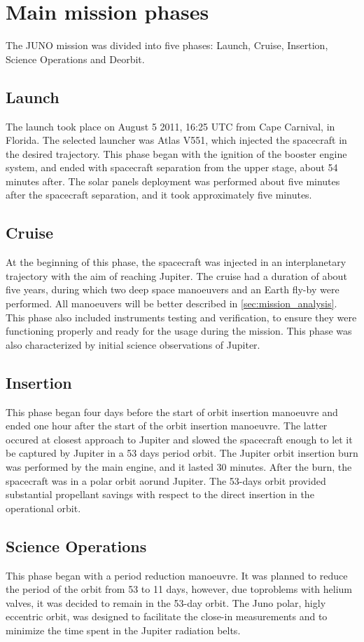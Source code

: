 \section{Main mission phases}
\label{sec:phases}
The JUNO mission was divided into five phases: Launch, Cruise, Insertion, Science Operations and Deorbit.
\subsection{Launch}
The launch took place on August 5 2011, 16:25 UTC from Cape Carnival, in Florida. The selected launcher was Atlas V551, which injected the spacecraft in the 
desired trajectory. This phase began with the ignition of the booster engine system, and ended with spacecraft separation from the upper
 stage,  about 54 minutes after. The solar panels deployment was performed about five minutes after the spacecraft separation, and it took approximately five minutes.
 \subsection{Cruise}
 At the beginning of this phase, the spacecraft was injected in an interplanetary trajectory with the aim of reaching Jupiter. The cruise had a duration of about 
 five years, during which two deep space manoeuvers  and an Earth fly-by were performed. All manoeuvers will be better described in 
 \autoref{sec:mission_analysis}. This phase also included instruments testing and verification, to ensure they were functioning properly and ready for the usage
 during the mission. This phase was also characterized by initial science observations of Jupiter. 
 \subsection{Insertion}
 This phase began four days before the start of orbit insertion manoeuvre and ended one hour after the start of the orbit insertion manoeuvre. The latter
 occured at closest approach to Jupiter and slowed the spacecraft enough to let it be captured by Jupiter in a 53 days period orbit. The Jupiter orbit insertion
 burn was performed by the main engine, and it lasted 30 minutes. After the burn, the spacecraft was in a polar orbit aorund Jupiter. The 53-days orbit
 provided substantial propellant savings with respect to the direct insertion in the operational orbit.
 \subsection{Science Operations}
 This phase began with a period reduction manoeuvre. It was planned to reduce the period of the orbit from 53 to 11 days, however, due toproblems 
  with helium valves, it was decided to remain in the 53-day orbit. The Juno polar, higly eccentric orbit, was designed to facilitate the close-in measurements and
  to minimize the time spent in the Jupiter radiation belts.

